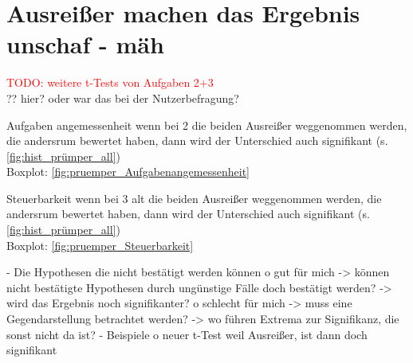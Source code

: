 \section{Ausreißer machen das Ergebnis unschaf - mäh}
\textcolor{red}{TODO: weitere t-Tests von Aufgaben 2+3}\\
?? hier? oder war das bei der Nutzerbefragung?

Aufgaben angemessenheit
wenn bei 2 die beiden Ausreißer weggenommen werden, die andersrum bewertet haben, dann wird der Unterschied auch signifikant (s. \autoref{fig:hist_prümper_all})\\
Boxplot: \autoref{fig:pruemper_Aufgabenangemessenheit}

Steuerbarkeit
wenn bei 3 alt die beiden Ausreißer weggenommen werden, die andersrum bewertet haben, dann wird der Unterschied auch signifikant (s. \autoref{fig:hist_prümper_all})\\
Boxplot: \autoref{fig:pruemper_Steuerbarkeit}

-	Die Hypothesen die nicht bestätigt werden können
o	gut für mich
-> können nicht bestätigte Hypothesen durch ungünstige Fälle doch bestätigt werden?
-> wird das Ergebnis noch signifikanter?
o	schlecht für mich
-> muss eine Gegendarstellung betrachtet werden?
-> wo führen Extrema zur Signifikanz, die sonst nicht da ist?
-	Beispiele
o	neuer t-Test weil Ausreißer, ist dann doch signifikant